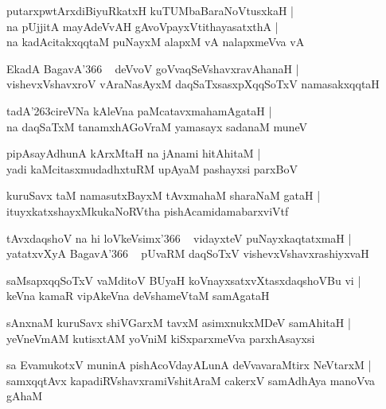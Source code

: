 \documentclass[twoside,12pt,openright]{book}
\def\S{\char'263}
\newcounter{shloka}[chapter]
\begin{document}
\begin{shloka}
putarxpwtArxdiBiyuRkatxH kuTUMbaBaraNoVtusxkaH |\\
na pUjjitA mayAdeVvAH gAvoVpayxVtithayasatxthA |\\
na kadAcitakxqqtaM puNayxM alapxM vA nalapxmeVva vA 
\end{shloka}

\begin{shloka}
EkadA BagavA\char'366 ~ deVvoV goVvaqSeVshavxravAhanaH |\\
vishevxVshavxroV vAraNasAyxM daqSaTxsasxpXqqSoTxV namasakxqqtaH 
\end{shloka}

\begin{shloka}
tadA\S cireVNa kAleVna paMcatavxmahamAgataH |\\
na daqSaTxM tanamxhAGoVraM yamasayx sadanaM muneV 
\end{shloka}

\begin{shloka}
pipAsayAdhunA kArxMtaH na jAnami hitAhitaM |\\
yadi kaMcitasxmudadhxtuRM upAyaM pashayxsi parxBoV 
\end{shloka}

\begin{shloka}
kuruSavx taM namasutxBayxM tAvxmahaM sharaNaM gataH |\\
ituyxkatxshayxMkukaNoRVtha pishAcamidamabarxviVtf 
\end{shloka}

\begin{shloka}
tAvxdaqshoV na hi loVkeVsimx\char'366 ~ vidayxteV puNayxkaqtatxmaH |\\
yatatxvXyA BagavA\char'366 ~ pUvaRM daqSoTxV vishevxVshavxrashiyxvaH 
\end{shloka}

\begin{shloka}
saMsapxqqSoTxV vaMditoV BUyaH koVnayxsatxvXtasxdaqshoVBu vi |\\
keVna kamaR vipAkeVna deVshameVtaM samAgataH 
\end{shloka}

\begin{shloka}
sAnxnaM kuruSavx shiVGarxM tavxM asimxnukxMDeV samAhitaH |\\
yeVneVmAM kutisxtAM yoVniM kiSxparxmeVva parxhAsayxsi
\end{shloka}

\begin{shloka}
sa EvamukotxV muninA pishAcoVdayALunA deVvavaraMtirx NeVtarxM |\\
samxqqtAvx kapadiRVshavxramiVshitAraM cakerxV samAdhAya manoVva gAhaM 
\end{shloka}
\end{document}
